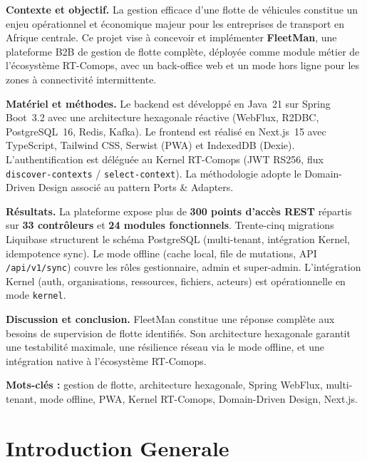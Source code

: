 \documentclass[12pt,a4paper]{report}
\begin{document}
\noindent\textbf{Contexte et objectif.}
La gestion efficace d'une flotte de véhicules constitue un enjeu opérationnel
et économique majeur pour les entreprises de transport en Afrique centrale.
Ce projet vise à concevoir et implémenter \textbf{FleetMan}, une plateforme
B2B de gestion de flotte complète, déployée comme module métier de
l'écosystème RT-Comops, avec un back-office web et un mode hors ligne
pour les zones à connectivité intermittente.

\noindent\textbf{Matériel et méthodes.}
Le backend est développé en Java~21 sur Spring Boot~3.2 avec une architecture
hexagonale réactive (WebFlux, R2DBC, PostgreSQL~16, Redis, Kafka).
Le frontend est réalisé en Next.js~15 avec TypeScript, Tailwind CSS,
Serwist (PWA) et IndexedDB (Dexie).
L'authentification est déléguée au Kernel RT-Comops (JWT RS256, flux
\texttt{discover-contexts} / \texttt{select-context}).
La méthodologie adopte le Domain-Driven Design associé au pattern
Ports \& Adapters.

\noindent\textbf{Résultats.}
La plateforme expose plus de \textbf{300 points d'accès REST} répartis sur
\textbf{33 contrôleurs} et \textbf{24 modules fonctionnels}.
Trente-cinq migrations Liquibase structurent le schéma PostgreSQL
(multi-tenant, intégration Kernel, idempotence sync).
Le mode offline (cache local, file de mutations, API \texttt{/api/v1/sync})
couvre les rôles gestionnaire, admin et super-admin.
L'intégration Kernel (auth, organisations, ressources, fichiers, acteurs)
est opérationnelle en mode \texttt{kernel}.

\noindent\textbf{Discussion et conclusion.}
FleetMan constitue une réponse complète aux besoins de supervision de flotte
identifiés. Son architecture hexagonale garantit une testabilité maximale,
une résilience réseau via le mode offline, et une intégration native
à l'écosystème RT-Comops.

\medskip
\noindent\textbf{Mots-clés :} gestion de flotte, architecture hexagonale,
Spring WebFlux, multi-tenant, mode offline, PWA, Kernel RT-Comops,
Domain-Driven Design, Next.js.

\chapter*{Introduction Generale}
\thispagestyle{fancy}
\end{document}
